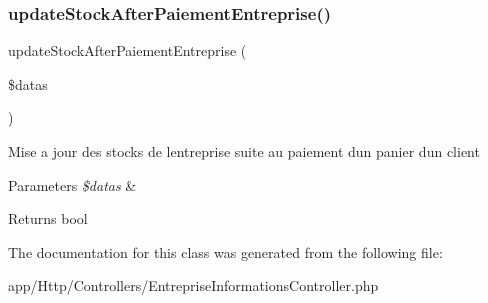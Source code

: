 \subsubsection{\texorpdfstring{update\+Stock\+After\+Paiement\+Entreprise()}{updateStockAfterPaiementEntreprise()}}
{\footnotesize\ttfamily update\+Stock\+After\+Paiement\+Entreprise (\begin{DoxyParamCaption}\item[{}]{\$datas }\end{DoxyParamCaption})}

Mise a jour des stocks de l\textquotesingle{}entreprise suite au paiement d\textquotesingle{}un panier d\textquotesingle{}un client 
\begin{DoxyParams}{Parameters}
{\em \$datas} & \\
\hline
\end{DoxyParams}
\begin{DoxyReturn}{Returns}
bool 
\end{DoxyReturn}


The documentation for this class was generated from the following file\+:\begin{DoxyCompactItemize}
\item 
app/\+Http/\+Controllers/Entreprise\+Informations\+Controller.\+php\end{DoxyCompactItemize}
